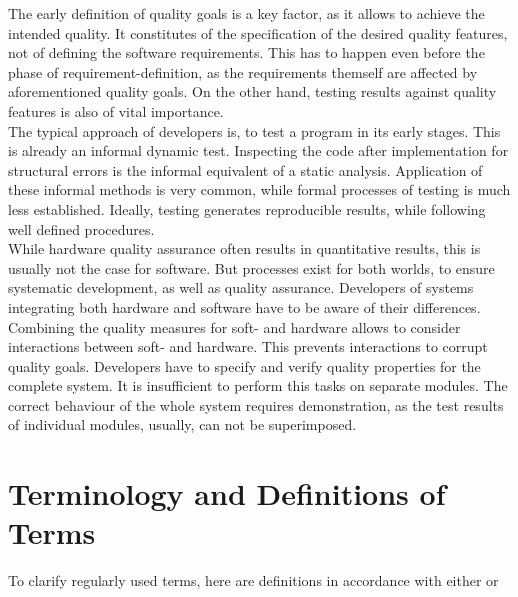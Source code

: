 	The early definition of quality goals is a key factor, as it allows to achieve the intended quality. It constitutes of the specification of the desired quality features, not of defining the software requirements. This has to happen even before the phase of requirement-definition, as the requirements themself are affected by aforementioned quality goals. On the other hand, testing results against quality features is also of vital importance. \\ 
	
	The typical approach of developers is, to test a program in its early stages. This is already an informal dynamic test. Inspecting the code after implementation for structural errors is the informal equivalent of a static analysis. Application of these informal methods is very common, while formal processes of testing is much less established. Ideally, testing generates reproducible results, while following well defined procedures. \\

	While hardware quality assurance often results in quantitative results, this is usually not the case for software. But processes exist for both worlds, to ensure systematic development, as well as quality assurance. Developers of systems integrating both hardware and software have to be aware of their differences. Combining the quality measures for soft- and hardware allows to consider interactions between soft- and hardware. This prevents interactions to corrupt quality goals. Developers have to specify and verify quality properties for the complete system. It is insufficient to perform this tasks on separate modules. The correct behaviour of the whole system requires demonstration, as the test results of individual modules, usually, can not be superimposed.
	
	\section{Terminology and Definitions of Terms}
	To clarify regularly used terms, here are definitions in accordance with either \cite{Kopetz1997} or \cite{Liggesmeyer2002}
